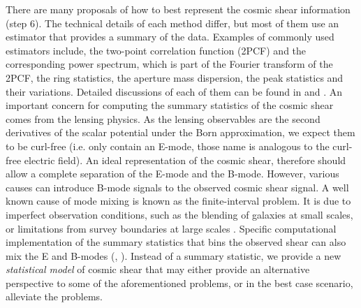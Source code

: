 There are many proposals of how to best represent the cosmic shear information
(step 6). The technical details of each method differ, but most of them use
an estimator that provides a summary of the data.
Examples of commonly used estimators include, the two-point correlation function 
(2PCF) and the corresponding power spectrum, which is part of the Fourier transform of the 2PCF, 
the ring statistics, the aperture mass dispersion, the peak statistics and
their variations. Detailed discussions of each of them can be found in 
\cite{Kilbinger2015} and \cite{Bartelmann2001a}.
An important concern for computing the summary statistics of the cosmic shear 
comes from the lensing physics. As the lensing observables are the second derivatives of the
scalar potential under the Born approximation, we expect them to be curl-free
(i.e. only contain an E-mode, those name is analogous to the curl-free electric
field). An ideal representation of the
cosmic shear, therefore should allow a complete separation of the E-mode and the B-mode.
However, various causes can
introduce B-mode signals to the observed cosmic shear signal. A well known
cause of mode mixing is known as the finite-interval problem. It is due to
imperfect observation conditions, such as the blending of galaxies at small scales,
or limitations from survey boundaries at large scales \citep{Kilbinger2013}.  
Specific computational implementation of the summary statistics that bins the 
observed shear can also mix the E and B-modes 
(\citealt{Eifler2010},
\citealt{Becker2013}). Instead of a summary statistic, we provide a new 
{\it statistical model} of cosmic shear that may either provide an alternative
perspective to some of the aforementioned problems, or in the best case
scenario, alleviate the problems. 
 
